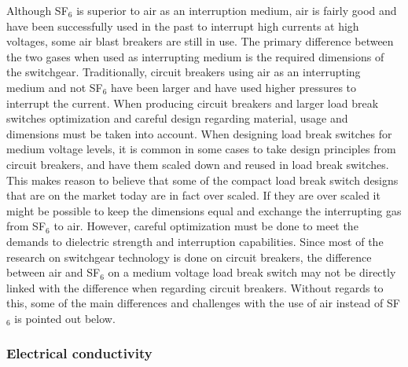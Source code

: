 \documentclass[10pt,a4paper,twoside]{article}
\begin{document}
Although SF$_6$ is superior to air as an interruption medium, air is fairly good and have been successfully used in the past to interrupt high currents at high voltages, some air blast breakers are still in use. The primary difference between the two gases when used as interrupting medium is the required dimensions of the switchgear. Traditionally, circuit breakers using air as an interrupting medium and not SF$_6$ have been larger and have used higher pressures to interrupt the current. When producing circuit breakers and larger load break switches optimization and careful design regarding material, usage and dimensions must be taken into account. When designing load break switches for medium voltage levels, it is common in some cases to take design principles from circuit breakers, and have them scaled down and reused in load break switches. This makes reason to believe that some of the compact load break switch designs that are on the market today are in fact over scaled. If they are over scaled it might be possible to keep the dimensions equal and exchange the interrupting gas from SF$_6$ to air. However, careful optimization must be done to meet the demands to dielectric strength and interruption capabilities. Since most of the research on switchgear technology is done on circuit breakers, the difference between air and SF$_6$ on a medium voltage load break switch may not be directly linked with the difference when regarding circuit breakers. Without regards to this, some of the main differences and challenges with the use of air instead of SF$_6$ is pointed out below.

\subsubsection*{Electrical conductivity}
\end{document}
